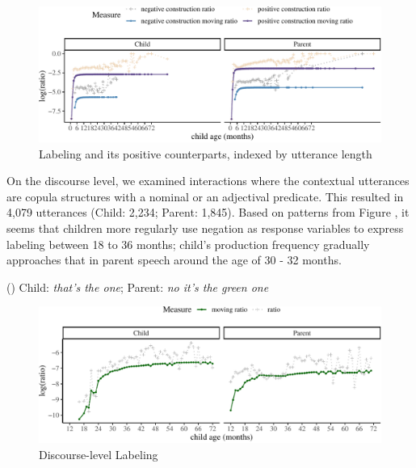 \documentclass[
  english,
  man,floatsintext]{apa6}
\begin{document}
\begin{figure}[H]

{\centering \includegraphics{neg_construction_article_files/figure-latex/learningul-1} 

}

\caption{Labeling and its positive counterparts, indexed by utterance length}\label{fig:learningul}
\end{figure}

On the discourse level, we examined interactions where the contextual utterances are copula structures with a nominal or an adjectival predicate. This resulted in 4,079 utterances (Child: 2,234; Parent: 1,845). Based on patterns from Figure , it seems that children more regularly use negation as response variables to express labeling between 18 to 36 months; child's production frequency gradually approaches that in parent speech around the age of 30 - 32 months.

() Child: \emph{that's the one}; Parent: \emph{no it's the green one}

\begin{figure}[H]

{\centering \includegraphics{neg_construction_article_files/figure-latex/learningdiscourse-1} 

}

\caption{Discourse-level Labeling}\label{fig:learningdiscourse}
\end{figure}

\clearpage
\end{document}

